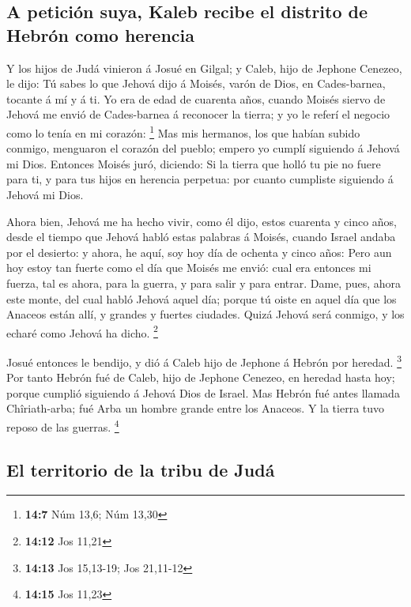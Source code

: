 \hypertarget{a-peticiuxf3n-suya-kaleb-recibe-el-distrito-de-hebruxf3n-como-herencia}{%
\subsection{A petición suya, Kaleb recibe el distrito de Hebrón como
herencia}\label{a-peticiuxf3n-suya-kaleb-recibe-el-distrito-de-hebruxf3n-como-herencia}}

 Y los hijos de Judá vinieron á Josué en Gilgal; y Caleb,
hijo de Jephone Cenezeo, le dijo: Tú sabes lo que Jehová dijo á Moisés,
varón de Dios, en Cades-barnea, tocante á mí y á ti.  Yo era
de edad de cuarenta años, cuando Moisés siervo de Jehová me envió de
Cades-barnea á reconocer la tierra; y yo le referí el negocio como lo
tenía en mi corazón: \footnote{\textbf{14:7} Núm 13,6; Núm 13,30}
 Mas mis hermanos, los que habían subido conmigo, menguaron
el corazón del pueblo; empero yo cumplí siguiendo á Jehová mi Dios.
 Entonces Moisés juró, diciendo: Si la tierra que holló tu
pie no fuere para ti, y para tus hijos en herencia perpetua: por cuanto
cumpliste siguiendo á Jehová mi Dios.

 Ahora bien, Jehová me ha hecho vivir, como él dijo, estos
cuarenta y cinco años, desde el tiempo que Jehová habló estas palabras á
Moisés, cuando Israel andaba por el desierto: y ahora, he aquí, soy hoy
día de ochenta y cinco años:  Pero aun hoy estoy tan fuerte
como el día que Moisés me envió: cual era entonces mi fuerza, tal es
ahora, para la guerra, y para salir y para entrar.  Dame,
pues, ahora este monte, del cual habló Jehová aquel día; porque tú oiste
en aquel día que los Anaceos están allí, y grandes y fuertes ciudades.
Quizá Jehová será conmigo, y los echaré como Jehová ha dicho.
\footnote{\textbf{14:12} Jos 11,21}

 Josué entonces le bendijo, y dió á Caleb hijo de Jephone á
Hebrón por heredad. \footnote{\textbf{14:13} Jos 15,13-19; Jos 21,11-12}
 Por tanto Hebrón fué de Caleb, hijo de Jephone Cenezeo, en
heredad hasta hoy; porque cumplió siguiendo á Jehová Dios de Israel.
 Mas Hebrón fué antes llamada Chîriath-arba; fué Arba un
hombre grande entre los Anaceos. Y la tierra tuvo reposo de las guerras.
\footnote{\textbf{14:15} Jos 11,23}

\hypertarget{el-territorio-de-la-tribu-de-juduxe1}{%
\subsection{El territorio de la tribu de
Judá}\label{el-territorio-de-la-tribu-de-juduxe1}}

